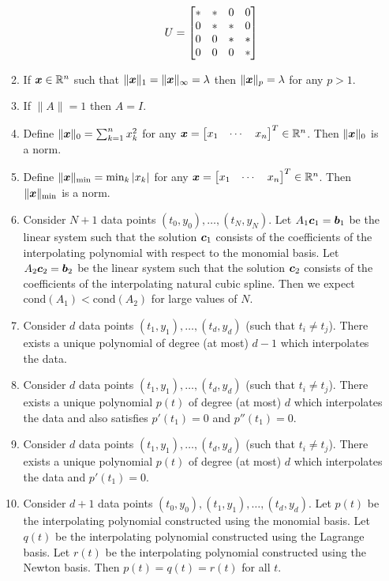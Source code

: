 \begin{enumerate}[leftmargin=*]
\begin{enumerate}
$$\hspace{5mm}
U = \begin{bmatrix} * & * & 0 & 0 \\ 0 & * & * & 0 \\ 0 & 0 & * & * \\ 0 & 0 & 0 & * \end{bmatrix}
$$
\item If $\boldsymbol{x} \in \mathbb{R}^n$ such that $\| \boldsymbol{x} \|_1 = \| \boldsymbol{x} \|_{\infty} = \lambda$ then $\| \boldsymbol{x} \|_p = \lambda$ for any $p > 1$.
\item If $\| A \| = 1$ then $A = I$.
\item Define $\| \boldsymbol{x} \|_0 = \sum_{k=1}^n x_k^2$ for any $\boldsymbol{x} = \begin{bmatrix} x_1 & \cdots & x_n \end{bmatrix}^T \in \mathbb{R}^n$. Then $\| \boldsymbol{x} \|_{0}$ is a norm.
\item Define $\| \boldsymbol{x} \|_{\min} = \min_k | x_k |$ for any $\boldsymbol{x} = \begin{bmatrix} x_1 & \cdots & x_n \end{bmatrix}^T \in \mathbb{R}^n$. Then $\| \boldsymbol{x} \|_{\min}$ is a norm.
\item Consider $N+1$ data points $(t_0,y_0),\dots,(t_N,y_N)$. Let $A_1 \boldsymbol{c}_1 = \boldsymbol{b}_1$ be the linear system such that the solution $\boldsymbol{c}_1$ consists of the coefficients of the interpolating polynomial with respect to the monomial basis. Let $A_2 \boldsymbol{c}_2 = \boldsymbol{b}_2$ be the linear system such that the solution $\boldsymbol{c}_2$ consists of the coefficients of the interpolating natural cubic spline. Then we expect $\mathrm{cond}(A_1) < \mathrm{cond}(A_2)$ for large values of $N$.
\item Consider $d$ data points $(t_1,y_1),\dots,(t_d,y_d)$ (such that $t_i \not= t_j$). There exists a unique polynomial of degree (at most) $d-1$ which interpolates the data.
\item Consider $d$ data points $(t_1,y_1),\dots,(t_d,y_d)$ (such that $t_i \not= t_j$). There exists a unique polynomial $p(t)$ of degree (at most) $d$ which interpolates the data and also satisfies $p'(t_1)=0$ and $p''(t_1)=0$.
\item Consider $d$ data points $(t_1,y_1),\dots,(t_d,y_d)$ (such that $t_i \not= t_j$). There exists a unique polynomial $p(t)$ of degree (at most) $d$ which interpolates the data and $p'(t_1)=0$.
\item Consider $d+1$ data points $(t_0,y_0),(t_1,y_1),\dots,(t_d,y_d)$. Let $p(t)$ be the interpolating polynomial constructed using the monomial basis. Let $q(t)$ be the interpolating polynomial constructed using the Lagrange basis. Let $r(t)$ be the interpolating polynomial constructed using the Newton basis. Then $p(t) = q(t) = r(t)$ for all $t$.

\end{enumerate}
\end{enumerate}
